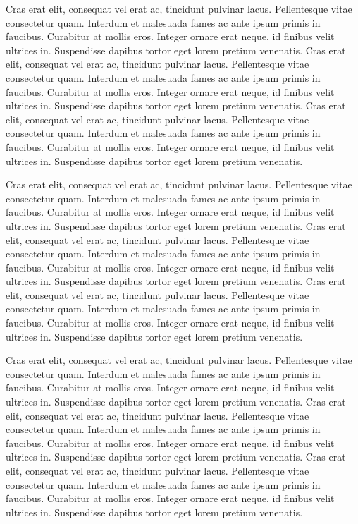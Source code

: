 \documentclass[./main.tex]{subfiles}
\begin{document}
\cite{Smith2006a}



\par Cras erat elit, consequat vel erat ac, tincidunt pulvinar lacus. Pellentesque vitae consectetur quam. Interdum et malesuada fames ac ante ipsum primis in faucibus. Curabitur at mollis eros. Integer ornare erat neque, id finibus velit ultrices in. Suspendisse dapibus tortor eget lorem pretium venenatis. Cras erat elit, consequat vel erat ac, tincidunt pulvinar lacus. Pellentesque vitae consectetur quam. Interdum et malesuada fames ac ante ipsum primis in faucibus. Curabitur at mollis eros. Integer ornare erat neque, id finibus velit ultrices in. Suspendisse dapibus tortor eget lorem pretium venenatis. Cras erat elit, consequat vel erat ac, tincidunt pulvinar lacus. Pellentesque vitae consectetur quam. Interdum et malesuada fames ac ante ipsum primis in faucibus. Curabitur at mollis eros. Integer ornare erat neque, id finibus velit ultrices in. Suspendisse dapibus tortor eget lorem pretium venenatis.

\par Cras erat elit, consequat vel erat ac, tincidunt pulvinar lacus. Pellentesque vitae consectetur quam. Interdum et malesuada fames ac ante ipsum primis in faucibus. Curabitur at mollis eros. Integer ornare erat neque, id finibus velit ultrices in. Suspendisse dapibus tortor eget lorem pretium venenatis. Cras erat elit, consequat vel erat ac, tincidunt pulvinar lacus. Pellentesque vitae consectetur quam. Interdum et malesuada fames ac ante ipsum primis in faucibus. Curabitur at mollis eros. Integer ornare erat neque, id finibus velit ultrices in. Suspendisse dapibus tortor eget lorem pretium venenatis. Cras erat elit, consequat vel erat ac, tincidunt pulvinar lacus. Pellentesque vitae consectetur quam. Interdum et malesuada fames ac ante ipsum primis in faucibus. Curabitur at mollis eros. Integer ornare erat neque, id finibus velit ultrices in. Suspendisse dapibus tortor eget lorem pretium venenatis.

\par Cras erat elit, consequat vel erat ac, tincidunt pulvinar lacus. Pellentesque vitae consectetur quam. Interdum et malesuada fames ac ante ipsum primis in faucibus. Curabitur at mollis eros. Integer ornare erat neque, id finibus velit ultrices in. Suspendisse dapibus tortor eget lorem pretium venenatis. Cras erat elit, consequat vel erat ac, tincidunt pulvinar lacus. Pellentesque vitae consectetur quam. Interdum et malesuada fames ac ante ipsum primis in faucibus. Curabitur at mollis eros. Integer ornare erat neque, id finibus velit ultrices in. Suspendisse dapibus tortor eget lorem pretium venenatis. Cras erat elit, consequat vel erat ac, tincidunt pulvinar lacus. Pellentesque vitae consectetur quam. Interdum et malesuada fames ac ante ipsum primis in faucibus. Curabitur at mollis eros. Integer ornare erat neque, id finibus velit ultrices in. Suspendisse dapibus tortor eget lorem pretium venenatis.
\end{document}
